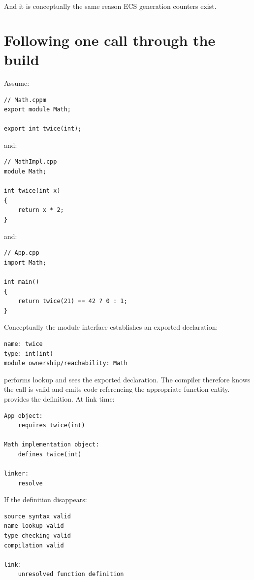 And it is conceptually the same reason ECS generation counters exist.

\section{Following one call through the build}\label{05-engine-i-ch003-following-one-call-through-the-build}

\hypertarget{05-engine-i-ch003-following-one-call-through-the-build}{}

Assume:

\begin{verbatim}
// Math.cppm
export module Math;

export int twice(int);
\end{verbatim}

and:

\begin{verbatim}
// MathImpl.cpp
module Math;

int twice(int x)
{
    return x * 2;
}
\end{verbatim}

and:

\begin{verbatim}
// App.cpp
import Math;

int main()
{
    return twice(21) == 42 ? 0 : 1;
}
\end{verbatim}

Conceptually the module interface establishes an exported declaration:

\begin{verbatim}
name: twice
type: int(int)
module ownership/reachability: Math
\end{verbatim}

 performs lookup and sees the exported declaration. The compiler therefore knows the call is valid and emits code referencing the appropriate function entity.  provides the definition. At link time:

\begin{verbatim}
App object:
    requires twice(int)

Math implementation object:
    defines twice(int)

linker:
    resolve
\end{verbatim}

If the definition disappears:

\begin{verbatim}
source syntax valid
name lookup valid
type checking valid
compilation valid

link:
    unresolved function definition
\end{verbatim}


